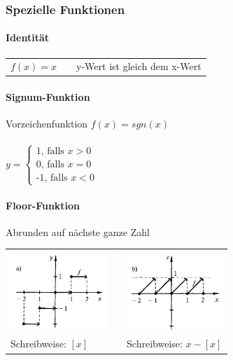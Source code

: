 			\subsubsection{Spezielle Funktionen}
			\paragraph{Identität}
			\begin{tabular}{lll}
			$f(x) = x$ & &  y-Wert ist gleich dem x-Wert 
			\end{tabular}
			
			
			\paragraph{Signum-Funktion}
			Vorzeichenfunktion $f(x)=sgn(x)$\\
			\\
			$y=\left\{\begin{array}{l}\text{1, falls $x>0$}\\
				\text{0, falls $x=0$}\\\text{-1, falls $x<0$}\end{array}\right.$
			\paragraph{Floor-Funktion}
			 Abrunden auf nächste ganze Zahl \\
			
			\begin{tabular}{lll}
			\includegraphics[height=3cm]{Bilder/floor-funktion} & &   \includegraphics[height=3cm]{Bilder/saegezahn-funktion} \\
			Schreibweise: \textbf{$[x]$} & &  Schreibweise: \textbf{$x - [x]$}
			\end{tabular}

            \columnbreak
			
